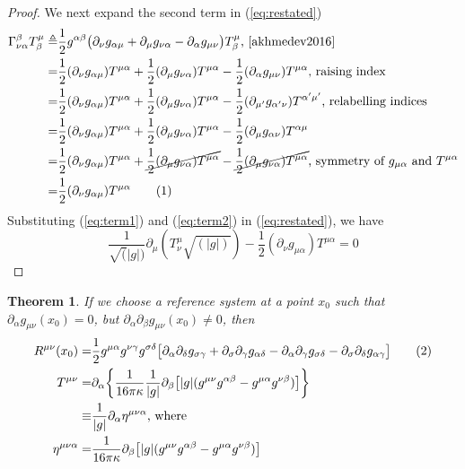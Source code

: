 \documentclass[]{article}
\newtheorem{theorem}{Theorem}
\newcommand\numberthis{\addtocounter{equation}{1}\tag{\theequation}}
\begin{document}
\begin{proof}
	We next expand the second term in (\ref{eq:restated})
	\begin{align*}
	\Gamma^{\beta}_{\nu\alpha}T^{\mu}_{\beta} \triangleq& \frac{1}{2} g^{\alpha\beta} \big( \partial_{\nu}g_{\alpha\mu} + \partial_{\mu}g_{\nu\alpha} - \partial_{\alpha}g_{\mu\nu}\big) T^{\mu}_{\beta}\text{, \cite[(45)]{akhmedev2016}}\\
	=&\frac{1}{2} (\partial_{\nu}g_{\alpha\mu})T^{\mu\alpha} + \frac{1}{2}  (\partial_{\mu}g_{\nu\alpha})T^{\mu\alpha} - \frac{1}{2}  (\partial_{\alpha}g_{\mu\nu}) T^{\mu\alpha}\text{, raising index}\\
	=&\frac{1}{2} (\partial_{\nu}g_{\alpha\mu})T^{\mu\alpha} + \frac{1}{2}  (\partial_{\mu}g_{\nu\alpha})T^{\mu\alpha} - \frac{1}{2}  (\partial_{\mu'}g_{\alpha'\nu}) T^{\alpha'\mu'}\text{, relabelling indices}\\
	=&\frac{1}{2} (\partial_{\nu}g_{\alpha\mu})T^{\mu\alpha} + \frac{1}{2}  (\partial_{\mu}g_{\nu\alpha})T^{\mu\alpha} - \frac{1}{2}  (\partial_{\mu}g_{\alpha\nu}) T^{\alpha\mu}\\
	=&\frac{1}{2} (\partial_{\nu}g_{\alpha\mu})T^{\mu\alpha} + \cancel{\frac{1}{2}  (\partial_{\mu}g_{\nu\alpha})T^{\mu\alpha}} - \cancel{\frac{1}{2}  (\partial_{\mu}g_{\nu\alpha}) T^{\mu\alpha}}\text{, symmetry of $g_{\mu\alpha}$ and $T^{\mu\alpha}$}\\
	=&\frac{1}{2} (\partial_{\nu}g_{\alpha\mu})T^{\mu\alpha} \numberthis\label{eq:term2}
	\end{align*}
	Substituting (\ref{eq:term1}) and (\ref{eq:term2}) in (\ref{eq:restated}), we have
	\begin{equation*}
	\frac{1}{\sqrt(|g|)}\partial_{\mu}(T^{\mu}_{\nu}\sqrt{(|g|)}) - \frac{1}{2}(\partial_{\nu}g_{\mu\alpha})T^{\mu\alpha}=0
	\end{equation*}
\end{proof}

\begin{theorem}
	If we choose a reference system at a point $x_0$ such that $\partial_{\alpha}g_{\mu\nu}(x_0)=0$, but $\partial_{\alpha}\partial_{\beta}g_{\mu\nu}(x_0)\neq0$, then
	\begin{align*}
	R^{\mu\nu}(x_0) = & \frac{1}{2}g^{\mu\alpha}g^{\nu\gamma}g^{\sigma\delta}\big[\partial_{\alpha}\partial_{\delta}g_{\sigma\gamma} + \partial_{\sigma}\partial_{\gamma}g_{\alpha\delta} - \partial_{\alpha}\partial_{\gamma}g_{\sigma\delta} - \partial_{\sigma}\partial_{\delta}g_{\alpha\gamma}\big] \numberthis\label{eq:R} \\
	T^{\mu\nu} =& \partial_{\alpha}\bigg\{ \frac{1}{16\pi\kappa}\frac{1}{|g|}\partial_{\beta}\big[|g|(g^{\mu\nu}g^{\alpha\beta}-g^{\mu\alpha}g^{\nu\beta})\big]\bigg\}\\
	\equiv& \frac{1}{|g|}\partial_{\alpha}\eta^{\mu\nu\alpha} \text{, where}\\
	\eta^{\mu\nu\alpha} =& \frac{1}{16\pi\kappa} \partial_{\beta} \big[|g|(g^{\mu\nu}g^{\alpha\beta}-g^{\mu\alpha}g^{\nu\beta})\big]
	\end{align*}
\end{theorem}
\end{document}
